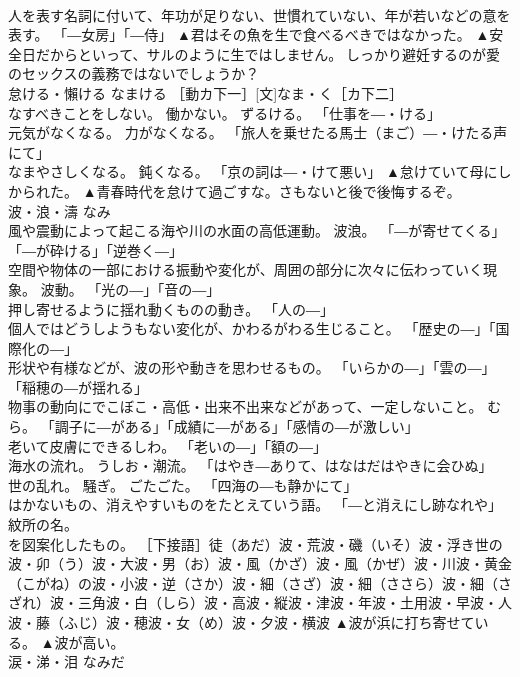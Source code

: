 \documentclass[8pt]{extreport}
\begin{document}
\begin{CJK}{UTF8}{min}
\\	人を表す名詞に付いて、年功が足りない、世慣れていない、年が若いなどの意を表す。 「―女房」「―侍」	▲君はその魚を生で食べるべきではなかった。 ▲安全日だからといって、サルのように生ではしません。 しっかり避妊するのが愛のセックスの義務ではないでしょうか？
\\	怠ける・懶ける	なまける	［動カ下一］[文]なま・く［カ下二］ 
\\	なすべきことをしない。 働かない。 ずるける。 「仕事を―・ける」 
\\	元気がなくなる。 力がなくなる。 「旅人を乗せたる馬士（まご）―・けたる声にて」 
\\	なまやさしくなる。 鈍くなる。 「京の詞は―・けて悪い」	▲怠けていて母にしかられた。 ▲青春時代を怠けて過ごすな。さもないと後で後悔するぞ。
\\	波・浪・濤	なみ	
\\	風や震動によって起こる海や川の水面の高低運動。 波浪。 「―が寄せてくる」「―が砕ける」「逆巻く―」 
\\	空間や物体の一部における振動や変化が、周囲の部分に次々に伝わっていく現象。 波動。 「光の―」「音の―」 
\\	押し寄せるように揺れ動くものの動き。 「人の―」 
\\	個人ではどうしようもない変化が、かわるがわる生じること。 「歴史の―」「国際化の―」 
\\	形状や有様などが、波の形や動きを思わせるもの。 「いらかの―」「雲の―」「稲穂の―が揺れる」 
\\	物事の動向にでこぼこ・高低・出来不出来などがあって、一定しないこと。 むら。 「調子に―がある」「成績に―がある」「感情の―が激しい」 
\\	老いて皮膚にできるしわ。 「老いの―」「額の―」 
\\	海水の流れ。 うしお・潮流。 「はやき―ありて、はなはだはやきに会ひぬ」 
\\	世の乱れ。 騒ぎ。 ごたごた。 「四海の―も静かにて」 
\\	はかないもの、消えやすいものをたとえていう語。 「―と消えにし跡なれや」 
\\	紋所の名。 
\\	を図案化したもの。 ［下接語］徒（あだ）波・荒波・磯（いそ）波・浮き世の波・卯（う）波・大波・男（お）波・風（かざ）波・風（かぜ）波・川波・黄金（こがね）の波・小波・逆（さか）波・細（さざ）波・細（ささら）波・細（さざれ）波・三角波・白（しら）波・高波・縦波・津波・年波・土用波・早波・人波・藤（ふじ）波・穂波・女（め）波・夕波・横波	▲波が浜に打ち寄せている。 ▲波が高い。
\\	涙・涕・泪	なみだ	

\end{CJK}
\end{document}
